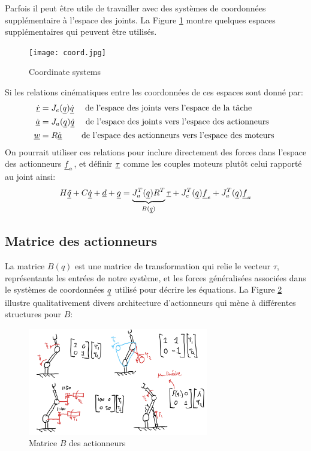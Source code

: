 Parfois il peut être utile de travailler avec des systèmes de coordonnées supplémentaire à l'espace des joints. La Figure \ref{fig:coord} montre quelques espaces supplémentaires qui peuvent être utilisés. 
%
\begin{figure}[H]
	\centering
		\texttt{[image: coord.jpg]}
	\caption{Coordinate systems}%
	\label{fig:coord}
\end{figure}
%
Si les relations cinématiques entre les coordonnées de ces espaces sont donné par:
%
\begin{align}
\underline{\dot{r}}   &= J_e( \underline{q} ) \underline{\dot{q} }  \quad \text{ de l'espace des joints vers l'espace de la tâche   } \\
\underline{\dot{a}}   &= J_a( \underline{q} ) \underline{\dot{q} }  \quad \text{ de l'espace des joints vers l'espace des actionneurs } \\
\underline{w }        &= R              \underline{\dot{a} }  \quad\quad \text{ de l'espace des actionneurs vers l'espace des moteurs } 
\label{eq:coord_transform2}
\end{align}
%
%
On pourrait utiliser ces relations pour inclure directement des forces dans l'espace des actionneurs $\underline{f}_a$, et définir $\underline{\tau}$ comme les couples moteurs plutôt celui rapporté au joint ainsi:
%
\begin{align}
H \underline{\ddot{q}} + C \underline{\dot{q}} + \underline{d} + \underline{g} =  \underbrace{ J_a^T(\underline{q}) R^T }_{B(\underline{q})}  \underline{\tau} + J_e^T(\underline{q}) \underline{f}_e + J_a^T(\underline{q}) \underline{f}_a
\label{eq:manipulator_gen}
\end{align}

\subsection{Matrice des actionneurs}

La matrice $B(q)$ est une matrice de transformation qui relie le vecteur $\tau$,  représentants les entrées de notre système, et les forces généralisées associées dans le systèmes de coordonnées $\underline{q}$ utilisé pour décrire les équations. La Figure \ref{fig:actuatormatrix} illustre qualitativement divers architecture d'actionneurs qui mène à différentes structures pour $B$:
\begin{figure}[H]
	\centering
		\includegraphics[width=0.70\textwidth]{fig/actuatormatrix.png}
	\caption{Matrice $B$ des actionneurs}%
	\label{fig:actuatormatrix}
\end{figure}

